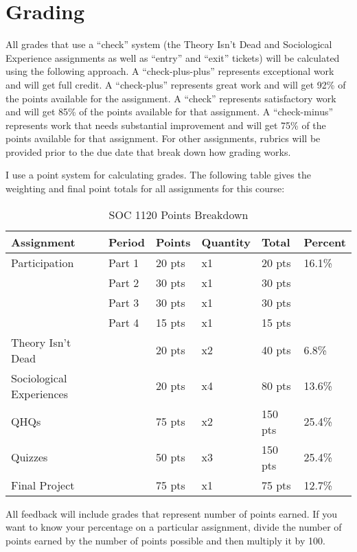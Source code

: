 \documentclass[
]{book}
\begin{document}
\hypertarget{grading}{%
\section{Grading}\label{grading}}

All grades that use a ``check'' system (the Theory Isn't Dead and Sociological Experience assignments as well as ``entry'' and ``exit'' tickets) will be calculated using the following approach. A ``check-plus-plus'' represents exceptional work and will get full credit. A ``check-plus'' represents great work and will get 92\% of the points available for the assignment. A ``check'' represents satisfactory work and will get 85\% of the points available for that assignment. A ``check-minus'' represents work that needs substantial improvement and will get 75\% of the points available for that assignment. For other assignments, rubrics will be provided prior to the due date that break down how grading works.

I use a point system for calculating grades. The following table gives the weighting and final point totals for all assignments for this course:

\begin{table}

\caption{\label{tab:unnamed-chunk-9}SOC 1120 Points Breakdown}
\centering
\begin{tabular}[t]{llllll}
\toprule
Assignment & Period & Points & Quantity & Total & Percent\\
\midrule
Participation & Part 1 & 20 pts & x1 & 20 pts & 16.1\%\\
 & Part 2 & 30 pts & x1 & 30 pts & \\
 & Part 3 & 30 pts & x1 & 30 pts & \\
 & Part 4 & 15 pts & x1 & 15 pts & \\
Theory Isn't Dead &  & 20 pts & x2 & 40 pts & 6.8\%\\
\addlinespace
Sociological Experiences &  & 20 pts & x4 & 80 pts & 13.6\%\\
QHQs &  & 75 pts & x2 & 150 pts & 25.4\%\\
Quizzes &  & 50 pts & x3 & 150 pts & 25.4\%\\
Final Project &  & 75 pts & x1 & 75 pts & 12.7\%\\
\bottomrule
\end{tabular}
\end{table}

All feedback will include grades that represent number of points earned. If you want to know your percentage on a particular assignment, divide the number of points earned by the number of points possible and then multiply it by 100.
\end{document}
